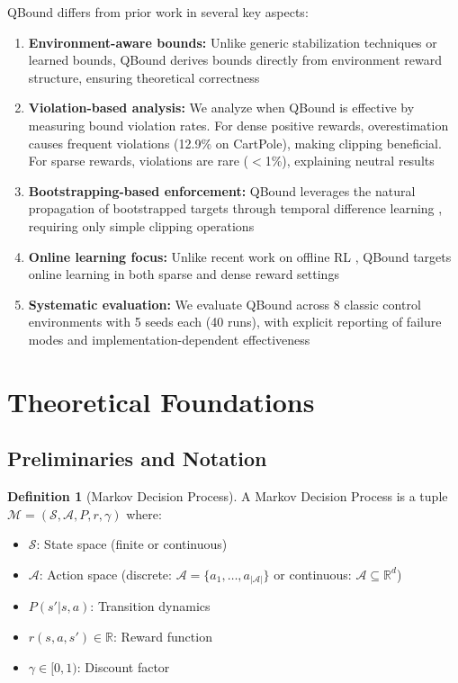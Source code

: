 \documentclass[11pt]{article}
\theoremstyle{definition}
\newtheorem{definition}[theorem]{Definition}
\theoremstyle{remark}
\begin{document}
QBound differs from prior work in several key aspects:
\begin{enumerate}
    \item \textbf{Environment-aware bounds:} Unlike generic stabilization techniques or learned bounds, QBound derives bounds directly from environment reward structure, ensuring theoretical correctness
    \item \textbf{Violation-based analysis:} We analyze when QBound is effective by measuring bound violation rates. For dense positive rewards, overestimation causes frequent violations (12.9\% on CartPole), making clipping beneficial. For sparse rewards, violations are rare ($<$1\%), explaining neutral results
    \item \textbf{Bootstrapping-based enforcement:} QBound leverages the natural propagation of bootstrapped targets through temporal difference learning \citep{sutton2018reinforcement}, requiring only simple clipping operations
    \item \textbf{Online learning focus:} Unlike recent work on offline RL \citep{wang2024adaptive, imagination2025limited}, QBound targets online learning in both sparse and dense reward settings
    \item \textbf{Systematic evaluation:} We evaluate QBound across 8 classic control environments with 5 seeds each (40 runs), with explicit reporting of failure modes and implementation-dependent effectiveness
\end{enumerate}

\section{Theoretical Foundations}

\subsection{Preliminaries and Notation}

\begin{definition}[Markov Decision Process]
A Markov Decision Process is a tuple $\mathcal{M} = (\mathcal{S}, \mathcal{A}, P, r, \gamma)$ where:
\begin{itemize}
    \item $\mathcal{S}$: State space (finite or continuous)
    \item $\mathcal{A}$: Action space (discrete: $\mathcal{A} = \{a_1, \ldots, a_{|\mathcal{A}|}\}$ or continuous: $\mathcal{A} \subseteq \mathbb{R}^d$)
    \item $P(s'|s,a)$: Transition dynamics
    \item $r(s,a,s') \in \mathbb{R}$: Reward function
    \item $\gamma \in [0,1)$: Discount factor
\end{itemize}
\end{definition}
\end{document}
